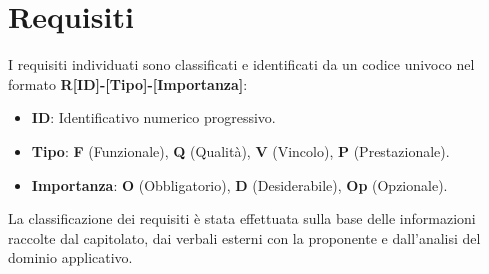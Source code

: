 \section{Requisiti}
I requisiti individuati sono classificati e identificati da un codice univoco nel formato \textbf{R[ID]-[Tipo]-[Importanza]}:
\begin{itemize}
	\item \textbf{ID}: Identificativo numerico progressivo.
	\item \textbf{Tipo}: \textbf{F} (Funzionale), \textbf{Q} (Qualità), \textbf{V} (Vincolo), \textbf{P} (Prestazionale).
	\item \textbf{Importanza}: \textbf{O} (Obbligatorio), \textbf{D} (Desiderabile), \textbf{Op} (Opzionale).
\end{itemize}

La classificazione dei requisiti è stata effettuata sulla base delle
informazioni raccolte dal capitolato, dai verbali esterni con la
proponente e dall'analisi del dominio applicativo.

